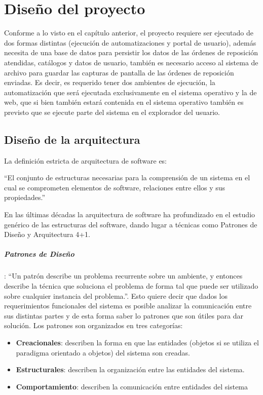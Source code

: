 \chapter{Diseño del proyecto}\label{cap3}
Conforme a lo visto en el capítulo anterior, el proyecto requiere ser ejecutado de dos formas distintas (ejecución de automatizaciones y portal de usuario), además necesita de una base de datos para persistir los datos de las órdenes de reposición atendidas, catálogos y datos de usuario, también es necesario acceso al sistema de archivo para guardar las capturas de pantalla de las órdenes de reposición enviadas. Es decir, es requerido tener dos ambientes de ejecución, la automatización que será ejecutada exclusivamente en el sistema operativo y la de web, que si bien también estará contenida en el sistema operativo también es previsto que se ejecute parte del sistema en el explorador del usuario.




\section{Diseño de la arquitectura}
La definición estricta de arquitectura de software es:
\begin{center}
	``El conjunto de estructuras necesarias para la comprensión de un sistema en el cual se comprometen elementos de software, relaciones entre ellos y sus propiedades.''\cite{SWEBOOK}
\end{center}
En las últimas décadas la arquitectura de software ha profundizado en el estudio genérico de las estructuras del software, dando lugar a técnicas como Patrones de Diseño y Arquitectura 4+1.\\
\paragraph*{Patrones de Diseño}: ``Un patrón describe un problema recurrente sobre un ambiente, y entonces describe la técnica que soluciona el problema de forma tal que puede ser utilizado sobre cualquier instancia del problema.''\cite{DesignPatterns}. Esto quiere decir que dados los requerimientos funcionales del sistema es posible analizar la comunicación entre sus distintas partes y de esta forma saber lo patrones que son útiles para dar solución. Los patrones son organizados en tres categorías:
\begin{itemize}
	\item \textbf{Creacionales}: describen la forma en que las entidades (objetos si se utiliza el paradigma orientado a objetos) del sistema son creadas.
	\item \textbf{Estructurales}: describen la organización entre las entidades del sistema.
	\item \textbf{Comportamiento}: describen la comunicación entre entidades del sistema
\end{itemize}
